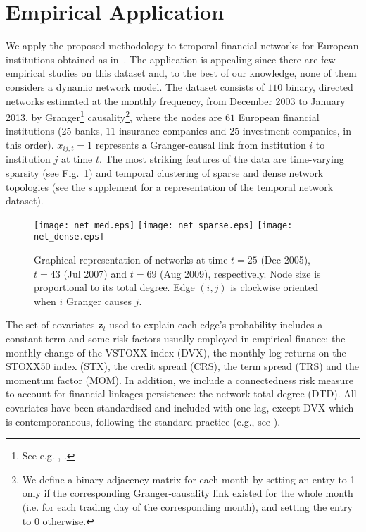\documentclass[12pt,a4paper]{article}
\theoremstyle{custom}
\begin{document}
\section{Empirical Application} \label{sec:application}
We apply the proposed methodology to temporal financial networks for European institutions obtained as in~\cite{Billioetal12GrangerNet}.
The application is appealing since there are few empirical studies on this dataset and, to the best of our knowledge, none of them considers a dynamic network model.
The dataset consists of $110$ binary, directed networks estimated at the monthly frequency, from December 2003 to January 2013, by Granger\footnote{See e.g. \cite{Swanson97IRF_Granger_causal}, \cite{Boudjellaba92Gramger_causal_test}.} causality\footnote{We define a binary adjacency matrix for each month by setting an entry to 1 only if the corresponding Granger-causality link existed for the whole month (i.e. for each trading day of the corresponding month), and setting the entry to 0 otherwise.}, where the nodes are $61$ European financial institutions ($25$ banks, $11$ insurance companies and $25$ investment companies, in this order).
$x_{ij,t} = 1$ represents a Granger-causal link from institution $i$ to institution $j$ at time $t$.
The most striking features of the data are time-varying sparsity (see Fig.~\ref{fig:data_graphs}) and temporal clustering of sparse and dense network topologies (see the supplement for a representation of the temporal network dataset).

\begin{figure}[H]
\setlength{\abovecaptionskip}{2pt}
\centering
\texttt{[image: net\_med.eps]} \qquad
\texttt{[image: net\_sparse.eps]} \qquad
\texttt{[image: net\_dense.eps]}
\caption{Graphical representation of networks at time $t=25$ (Dec 2005), $t=43$ (Jul 2007) and $t=69$ (Aug 2009), respectively. Node size is proportional to its total degree. Edge $(i,j)$ is clockwise oriented when $i$ Granger causes $j$.}
\label{fig:data_graphs}
\end{figure}

The set of covariates $\mathbf{z}_t$ used to explain each edge's probability includes a constant term and some risk factors usually employed in empirical finance: the monthly change of the VSTOXX index (DVX), the monthly log-returns on the STOXX50 index (STX), the credit spread (CRS), the term spread (TRS) and the momentum factor (MOM). In addition, we include a connectedness risk measure to account for financial linkages persistence: the network total degree (DTD).
All covariates have been standardised and included with one lag, except DVX which is contemporaneous, following the standard practice (e.g., see \cite{Majewski15OptionPricing_VolatilityLeverage}).
\end{document}
